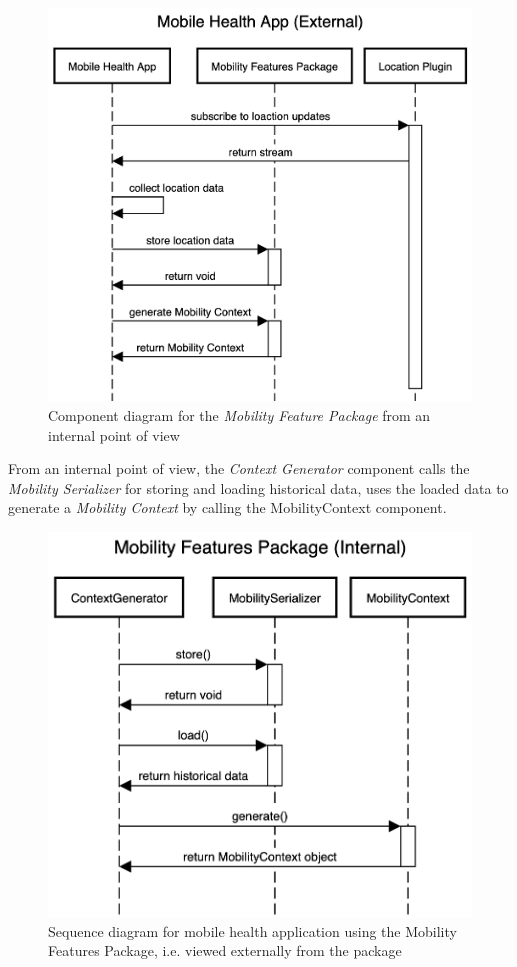 \begin{figure}[h]
\centering
\includegraphics[width=\textwidth]{images/diagrams/sequence-external.png}
\caption{Component diagram for the \textit{Mobility Feature Package} from an internal point of view}
\label{fig:sequence-diagram-internal}
\end{figure}

From an internal point of view, the \textit{Context Generator} component calls the \textit{Mobility Serializer} for storing and loading historical data, uses the loaded data to generate a \textit{Mobility Context} by calling the MobilityContext component.
\begin{figure}[h]
\centering
\includegraphics[width=\textwidth]{images/diagrams/sequence-internal.png}
\caption{Sequence diagram for mobile health application using the Mobility Features Package, i.e. viewed externally from the package}
\label{fig:sequence-diagram-external}
\end{figure}